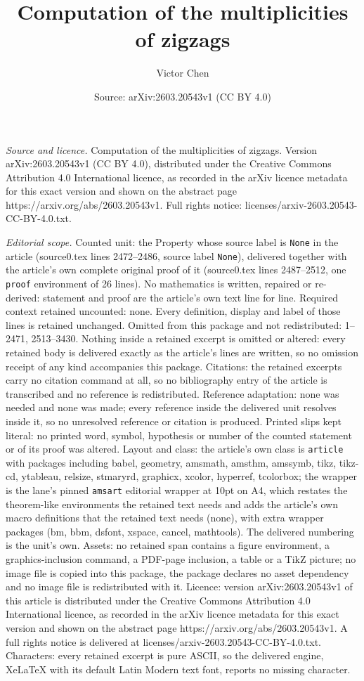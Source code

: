 \documentclass[10pt,a4paper]{amsart}
\title[Computation of the multiplicities of zigzags]{Computation of the multiplicities of zigzags}
\author{Victor Chen}
\date{Source: arXiv:2603.20543v1 (CC BY 4.0)}
\begin{document}
\maketitle

\noindent\emph{Source and licence.} Computation of the multiplicities of zigzags. Version arXiv:2603.20543v1 (CC BY 4.0), distributed under the Creative Commons Attribution 4.0 International licence, as recorded in the arXiv licence metadata for this exact version and shown on the abstract page https://arxiv.org/abs/2603.20543v1. Full rights notice: licenses/arxiv-2603.20543-CC-BY-4.0.txt.\par\smallskip

\noindent\textit{Editorial scope.} Counted unit: the Property whose source label is \texttt{None} in the article (source0.tex lines 2472--2486, source label \texttt{None}), delivered together with the article's own complete original proof of it (source0.tex lines 2487--2512, one \texttt{proof} environment of 26 lines). No mathematics is written, repaired or re-derived: statement and proof are the article's own text line for line. Required context retained uncounted: none. Every definition, display and label of those lines is retained unchanged. Omitted from this package and not redistributed: 1--2471, 2513--3430. Nothing inside a retained excerpt is omitted or altered: every retained body is delivered exactly as the article's lines are written, so no omission receipt of any kind accompanies this package. Citations: the retained excerpts carry no citation command at all, so no bibliography entry of the article is transcribed and no reference is redistributed. Reference adaptation: none was needed and none was made; every reference inside the delivered unit resolves inside it, so no unresolved reference or citation is produced. Printed slips kept literal: no printed word, symbol, hypothesis or number of the counted statement or of its proof was altered. Layout and class: the article's own class is \texttt{article} with packages including babel, geometry, amsmath, amsthm, amssymb, tikz, tikz-cd, ytableau, relsize, stmaryrd, graphicx, xcolor, hyperref, tcolorbox; the wrapper is the lane's pinned \texttt{amsart} editorial wrapper at 10pt on A4, which restates the theorem-like environments the retained text needs and adds the article's own macro definitions that the retained text needs (none), with extra wrapper packages (bm, bbm, dsfont, xspace, cancel, mathtools). The delivered numbering is the unit's own. Assets: no retained span contains a figure environment, a graphics-inclusion command, a PDF-page inclusion, a table or a TikZ picture; no image file is copied into this package, the package declares no asset dependency and no image file is redistributed with it. Licence: version arXiv:2603.20543v1 of this article is distributed under the Creative Commons Attribution 4.0 International licence, as recorded in the arXiv licence metadata for this exact version and shown on the abstract page https://arxiv.org/abs/2603.20543v1. A full rights notice is delivered at licenses/arxiv-2603.20543-CC-BY-4.0.txt. Characters: every retained excerpt is pure ASCII, so the delivered engine, XeLaTeX with its default Latin Modern text font, reports no missing character.
\end{document}
